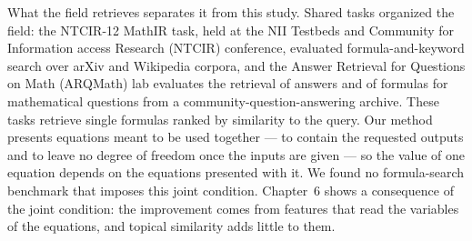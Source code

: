 What the field retrieves separates it from this study. Shared tasks organized the field: the
NTCIR-12 MathIR task, held at the NII Testbeds and Community for Information access Research
(NTCIR) conference, evaluated formula-and-keyword search over arXiv and Wikipedia
corpora\cite{NTCIR12}, and the Answer Retrieval for Questions on Math (ARQMath) lab evaluates the
retrieval of answers and of formulas for mathematical questions from a
community-question-answering archive\cite{ARQMath}. These tasks retrieve single formulas ranked by
similarity to the query. Our method presents equations meant to be used together --- to contain
the requested outputs and to leave no degree of freedom once the inputs are given --- so the value
of one equation depends on the equations presented with it. We found no formula-search benchmark that imposes this
joint condition. Chapter~6 shows a consequence of the joint condition: the improvement comes from
features that read the variables of the equations, and topical similarity adds little to them.
